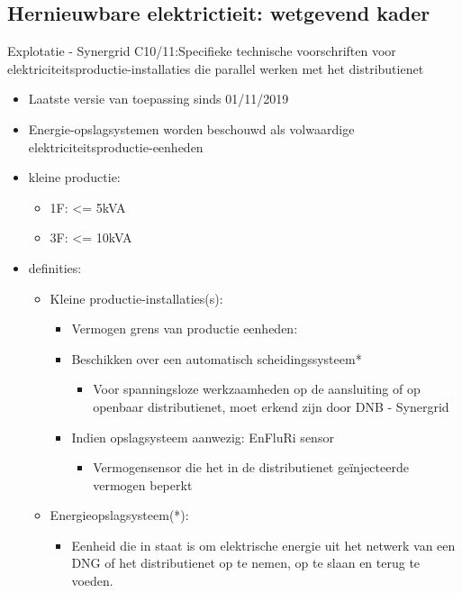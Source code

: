\documentclass[12pt]{article}
\begin{document}
\subsection{Hernieuwbare elektrictieit: wetgevend kader}
Explotatie - Synergrid C10/11:Specifieke technische voorschriften voor elektriciteitsproductie-installaties die parallel werken met het distributienet\begin{itemize}
    \item Laatste versie van toepassing sinds 01/11/2019 
    \item Energie-opslagsystemen worden beschouwd als volwaardige elektriciteitsproductie-eenheden
    \item kleine productie:\begin{itemize}
        \item 1F: <= 5kVA
        \item 3F: <= 10kVA
    \end{itemize}
    \item definities:\begin{itemize}
        \item Kleine productie-installaties(s):\begin{itemize}
            \item Vermogen grens van productie eenheden:%
            \item Beschikken over een automatisch scheidingssysteem*\begin{itemize}
                \item Voor spanningsloze werkzaamheden op de aansluiting of op openbaar distributienet, moet erkend zijn door DNB - Synergrid
            \end{itemize}
            \item Indien opslagsysteem aanwezig: EnFluRi sensor\begin{itemize}
                \item Vermogensensor die het in de distributienet geïnjecteerde vermogen beperkt
            \end{itemize}
        \end{itemize}
        \item Energieopslagsysteem(*):\begin{itemize}
            \item Eenheid die in staat is om elektrische energie uit het netwerk van een DNG of het
            distributienet op te nemen, op te slaan en terug te voeden.
        \end{itemize}

\end{itemize}
\end{itemize}
\end{document}
